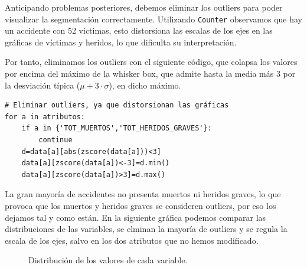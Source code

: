 \documentclass[oneside]{book}
\begin{document}
Anticipando problemas posteriores, debemos eliminar los outliers para
poder visualizar la segmentación correctamente. Utilizando
\texttt{Counter} observamos que hay un accidente con 52 víctimas, esto
distorsiona las escalas de los ejes en las gráficas de víctimas y
heridos, lo que dificulta su interpretación.

Por tanto, eliminamos los outliers con el siguiente código, que
colapsa los valores por encima del máximo de la whisker box, que
admite hasta la media más 3 por la desviación típica
($\mu+3\cdot\sigma$), en dicho máximo. 

\begin{verbatim}
# Eliminar outliers, ya que distorsionan las gráficas
for a in atributos:
    if a in {'TOT_MUERTOS','TOT_HERIDOS_GRAVES'}:
        continue
    d=data[a][abs(zscore(data[a]))<3]
    data[a][zscore(data[a])<-3]=d.min()
    data[a][zscore(data[a])>3]=d.max()
\end{verbatim}

La gran mayoría de accidentes no presenta muertos ni heridos graves,
lo que provoca que los muertos y heridos graves se consideren
outliers, por eso los dejamos tal y como están. En la siguiente
gráfica podemos comparar las distribuciones de las variables, se
elminan la mayoría de outliers y se regula la escala de los ejes,
salvo en los dos atributos que no hemos modificado.

\begin{figure}[H]
  \centering
  \caption{Distribución de los valores de cada variable.}
  \label{fig:ward1-scores}
\end{figure}
\end{document}
